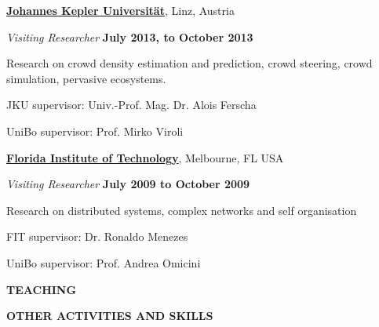 \documentclass[10pt]{article}
\newenvironment{outerlist}[1][\enskip\textbullet]%
        {\begin{itemize}[#1]}{\end{itemize}%
         \vspace{-.6\baselineskip}}
\newenvironment{innerlist}[1][\enskip\textbullet]%
        {\begin{compactitem}[#1]}{\end{compactitem}}
\newcommand{\halfblankline}{\quad\vspace{-0.5\baselineskip}\pagebreak[3]}
\newcommand{\macrosection}[1]{

\vspace{20pt}
\hrulefill
\begin{center}
\textbf{#1}
\end{center}
\vspace{-7pt}
\hrulefill
}
\begin{document}
\href{http://www.jku.at/}{\textbf{Johannes Kepler Universität}}, Linz, Austria
\begin{outerlist}
\item[] \textit{Visiting Researcher} \hfill \textbf{July 2013, to October 2013}
    \begin{innerlist}
      \item Research on crowd density estimation and prediction, crowd steering, crowd simulation, pervasive ecosystems.
      \item JKU supervisor: Univ.-Prof. Mag. Dr. Alois Ferscha
      \item UniBo supervisor: Prof. Mirko Viroli
    \end{innerlist}
\halfblankline
\end{outerlist}

\href{http://www.fit.edu/}{\textbf{Florida Institute of Technology}}, Melbourne, FL USA
\begin{outerlist}
\item[] \textit{Visiting Researcher} \hfill \textbf{July 2009 to October 2009}
    \begin{innerlist}
      \item Research on distributed systems, complex networks and self organisation
      \item FIT supervisor: Dr. Ronaldo Menezes
      \item UniBo supervisor: Prof. Andrea Omicini
    \end{innerlist}
\halfblankline
\end{outerlist}

\macrosection{TEACHING}



\macrosection{OTHER ACTIVITIES AND SKILLS}

\halfblankline{}

\newcount\languagecount
\newcommand\languageknowledge[2]
  {%
  \hbox
      {%
        \languagecount=0
        \loop\ifnum\languagecount<#2
          \advance\languagecount1
          \textcolor{languagecolor}{$\bullet$}%
        \repeat
        \loop\ifnum\languagecount<10
          \advance\languagecount1
          \textcolor{nolanguagecolor}{$\bullet$}%
        \repeat
        \hspace{5pt} #1
      }%

    }
\end{document}
